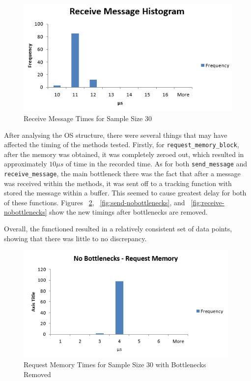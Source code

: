 \documentclass[se]{uw-wkrpt}
\begin{document}
\begin{figure}[bp!]
\centering
\includegraphics[width=120mm]{ReceiveMessageHistogram.PNG}
\caption{Receive Message Times for Sample Size 30}
\label{fig:receive}
\end{figure}

After analysing the OS structure, there were several things that may have affected the timing of the methods tested. Firstly, for \texttt{request\_memory\_block}, after the memory was obtained, it was completely zeroed out, which resulted in approximately $10\mu s$ of time in the recorded time. As for both \texttt{send\_message} and \texttt{receive\_message}, the main bottleneck there was the fact that after a message was received within the methods, it was sent off to a tracking function with stored the message within a buffer. This seemed to cause greatest delay for both of these functions. Figures ~\ref{fig:mem-nobottlenecks}, ~\ref{fig:send-nobottlenecks}, and ~\ref{fig:receive-nobottlenecks} show the new timings after bottlenecks are removed. 

Overall, the functioned resulted in a relatively consistent set of data points, showing that there was little to no discrepancy.

\begin{figure}[bp!]
\centering
\includegraphics[width=110mm]{NB-RequestMemoryHistogram.png}
\caption{Request Memory Times for Sample Size 30 with Bottlenecks Removed}
\label{fig:mem-nobottlenecks}
\end{figure}
\end{document}
